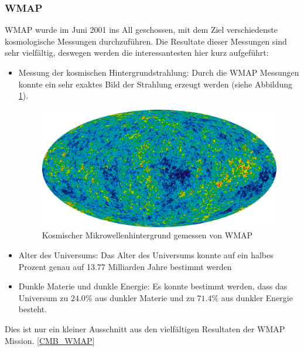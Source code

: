 \subsubsection{\ac{WMAP}}
\ac{WMAP} wurde im Juni 2001 ins All geschossen, mit dem Ziel verschiedenste 
kosmologische Messungen durchzuführen.
Die Resultate dieser Messungen sind sehr vielfältig, deswegen werden die 
interessantesten hier kurz aufgeführt:
\begin{itemize}
	\item Messung der kosmischen Hintergrundstrahlung: Durch die \ac{WMAP} 
	Messungen konnte ein sehr exaktes Bild der Strahlung erzeugt werden (siehe 
	Abbildung \ref{fig:CMB_WMAP}).
	\begin{figure}
		\includegraphics[width=\linewidth]{cmb/images/CMB_WMAP.png}
		\caption{Kosmischer Mikrowellenhintergrund gemessen von \ac{WMAP}}
		\label{fig:CMB_WMAP}
	\end{figure}
	\item Alter des Universums: Das Alter des Universums konnte auf ein halbes 
	Prozent genau auf 13.77 Milliarden Jahre bestimmt werden
	\item Dunkle Materie und dunkle Energie: Es konnte bestimmt werden, dass 
	das Universum zu $24.0 \%$ aus dunkler Materie und zu $71.4\%$ aus 
	dunkler Energie besteht.
\end{itemize}
Dies ist nur ein kleiner Ausschnitt aus den vielfältigen Resultaten der 
\ac{WMAP} Mission. \ref{CMB_WMAP}


